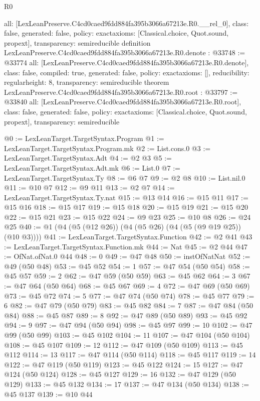 \begin{lexlean}{R0}
\begin{coremodule}
{  all: [LexLeanPreserve.C4cd0caed9fdd884fa395b3066a67213e.R0.__rel_0],
  class: false,
  generated: false,
  policy: exact{axioms: [Classical.choice, Quot.sound, propext]},
  transparency: semireducible
}
definition LexLeanPreserve.C4cd0caed9fdd884fa395b3066a67213e.R0.denote : @33748 := @33774 {
  all: [LexLeanPreserve.C4cd0caed9fdd884fa395b3066a67213e.R0.denote],
  class: false,
  compiled: true,
  generated: false,
  policy: exact{axioms: []},
  reducibility: regular{height: 8},
  transparency: semireducible
}
theorem LexLeanPreserve.C4cd0caed9fdd884fa395b3066a67213e.R0.root : @33797 := @33840 {
  all: [LexLeanPreserve.C4cd0caed9fdd884fa395b3066a67213e.R0.root],
  class: false,
  generated: false,
  policy: exact{axioms: [Classical.choice, Quot.sound, propext]},
  transparency: semireducible
}

@0 := LexLeanTarget.TargetSyntax.Program
@1 := LexLeanTarget.TargetSyntax.Program.mk
@2 := List.cons.{0}
@3 := LexLeanTarget.TargetSyntax.Adt
@4 := @2 @3
@5 := LexLeanTarget.TargetSyntax.Adt.mk
@6 := List.{0}
@7 := LexLeanTarget.TargetSyntax.Ty
@8 := @6 @7
@9 := @2 @8
@10 := List.nil.{0}
@11 := @10 @7
@12 := @9 @11
@13 := @2 @7
@14 := LexLeanTarget.TargetSyntax.Ty.nat
@15 := @13 @14
@16 := @15 @11
@17 := @15 @16
@18 := @15 @17
@19 := @15 @18
@20 := @15 @19
@21 := @15 @20
@22 := @15 @21
@23 := @15 @22
@24 := @9 @23
@25 := @10 @8
@26 := @24 @25
@40 := @1 (@4 (@5 (@12 @26)) (@4 (@5 @26) (@4 (@5 (@9 @19 @25)) (@10 @3))))
@41 := LexLeanTarget.TargetSyntax.Function
@42 := @2 @41
@43 := LexLeanTarget.TargetSyntax.Function.mk
@44 := Nat
@45 := @2 @44
@47 := OfNat.ofNat.{0} @44
@48 := 0
@49 := @47 @48
@50 := instOfNatNat
@52 := @49 (@50 @48)
@53 := @45 @52
@54 := 1
@57 := @47 @54 (@50 @54)
@58 := @45 @57
@59 := 2
@62 := @47 @59 (@50 @59)
@63 := @45 @62
@64 := 3
@67 := @47 @64 (@50 @64)
@68 := @45 @67
@69 := 4
@72 := @47 @69 (@50 @69)
@73 := @45 @72
@74 := 5
@77 := @47 @74 (@50 @74)
@78 := @45 @77
@79 := 6
@82 := @47 @79 (@50 @79)
@83 := @45 @82
@84 := 7
@87 := @47 @84 (@50 @84)
@88 := @45 @87
@89 := 8
@92 := @47 @89 (@50 @89)
@93 := @45 @92
@94 := 9
@97 := @47 @94 (@50 @94)
@98 := @45 @97
@99 := 10
@102 := @47 @99 (@50 @99)
@103 := @45 @102
@104 := 11
@107 := @47 @104 (@50 @104)
@108 := @45 @107
@109 := 12
@112 := @47 @109 (@50 @109)
@113 := @45 @112
@114 := 13
@117 := @47 @114 (@50 @114)
@118 := @45 @117
@119 := 14
@122 := @47 @119 (@50 @119)
@123 := @45 @122
@124 := 15
@127 := @47 @124 (@50 @124)
@128 := @45 @127
@129 := 16
@132 := @47 @129 (@50 @129)
@133 := @45 @132
@134 := 17
@137 := @47 @134 (@50 @134)
@138 := @45 @137
@139 := @10 @44

\end{coremodule}
\end{lexlean}
